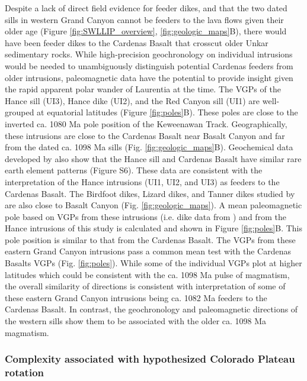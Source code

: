Despite a lack of direct field evidence for feeder dikes, and that the two dated sills in western Grand Canyon cannot be feeders to the lava flows given their older age (Figure \ref{fig:SWLLIP_overview}, \ref{fig:geologic_maps}B), there would have been feeder dikes to the Cardenas Basalt that crosscut older Unkar sedimentary rocks. While high-precision geochronology on individual intrusions would be needed to unambiguously distinguish potential Cardenas feeders from older intrusions, paleomagnetic data have the potential to provide insight given the rapid apparent polar wander of Laurentia at the time. The VGPs of the Hance sill (UI3), Hance dike (UI2), and the Red Canyon sill (UI1) are well-grouped at equatorial latitudes (Figure \ref{fig:poles}B). These poles are close to the inverted ca. 1080 Ma pole position of the Keweenawan Track. Geographically, these intrusions are close to the Cardenas Basalt near Basalt Canyon and far from the dated ca. 1098 Ma sills (Fig. \ref{fig:geologic_maps}B). Geochemical data developed by \cite{Larson1994a} also show that the Hance sill and Cardenas Basalt have similar rare earth element patterns (Figure S6). These data are consistent with the interpretation of the Hance intrusions (UI1, UI2, and UI3) as feeders to the Cardenas Basalt. The Birdfoot dikes, Lizard dikes, and Tanner dikes studied by \cite{Weil2003a} are also close to Basalt Canyon (Fig. \ref{fig:geologic_maps}). A mean paleomagnetic pole based on VGPs from these intrusions (i.e. dike data from \cite{Weil2003a}) and from the Hance intrusions of this study is calculated and shown in Figure \ref{fig:poles}B. This pole position is similar to that from the Cardenas Basalt. The VGPs from these eastern Grand Canyon intrusions pass a common mean test with the Cardenas Basalts VGPs (Fig. \ref{fig:poles}). While some of the individual VGPs plot at higher latitudes which could be consistent
with the ca. 1098 Ma pulse of magmatism, the overall similarity of directions is consistent with interpretation of some of these eastern Grand Canyon intrusions being ca. 1082 Ma feeders to the Cardenas Basalt. In contrast, the geochronology and paleomagnetic directions of the western sills show them to be associated with the older ca. 1098 Ma magmatism. 

\subsubsection*{Complexity associated with hypothesized Colorado Plateau rotation}

